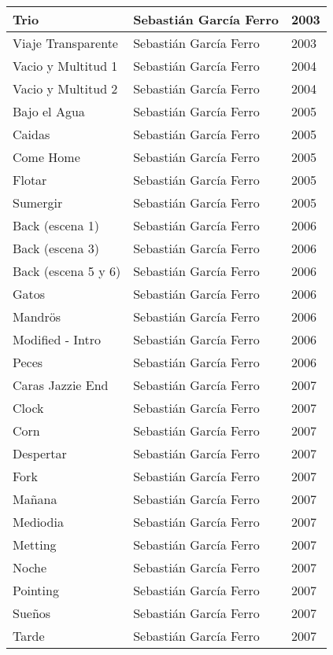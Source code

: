 \begin{center}
\begin{longtable}{ p{}  p{}  p{} }
Trio & Sebastián García Ferro & 2003 \\ \midrule 
Viaje Transparente & Sebastián García Ferro & 2003 \\ \midrule 
Vacio y Multitud 1 & Sebastián García Ferro & 2004 \\ \midrule 
Vacio y Multitud 2 & Sebastián García Ferro & 2004 \\ \midrule 
Bajo el Agua & Sebastián García Ferro & 2005 \\ \midrule 
Caidas & Sebastián García Ferro & 2005 \\ \midrule 
Come Home & Sebastián García Ferro & 2005 \\ \midrule 
Flotar & Sebastián García Ferro & 2005 \\ \midrule 
Sumergir & Sebastián García Ferro & 2005 \\ \midrule 
Back (escena 1) & Sebastián García Ferro & 2006 \\ \midrule 
Back (escena 3) & Sebastián García Ferro & 2006 \\ \midrule 
Back (escena 5 y 6) & Sebastián García Ferro & 2006 \\ \midrule 
Gatos & Sebastián García Ferro & 2006 \\ \midrule 
Mandrös & Sebastián García Ferro & 2006 \\ \midrule 
Modified - Intro & Sebastián García Ferro & 2006 \\ \midrule 
Peces & Sebastián García Ferro & 2006 \\ \midrule 
Caras Jazzie End & Sebastián García Ferro & 2007 \\ \midrule 
Clock & Sebastián García Ferro & 2007 \\ \midrule 
Corn & Sebastián García Ferro & 2007 \\ \midrule 
Despertar & Sebastián García Ferro & 2007 \\ \midrule 
Fork & Sebastián García Ferro & 2007 \\ \midrule 
Mañana & Sebastián García Ferro & 2007 \\ \midrule 
Mediodia & Sebastián García Ferro & 2007 \\ \midrule 
Metting & Sebastián García Ferro & 2007 \\ \midrule 
Noche & Sebastián García Ferro & 2007 \\ \midrule 
Pointing & Sebastián García Ferro & 2007 \\ \midrule 
Sueños & Sebastián García Ferro & 2007 \\ \midrule 
Tarde & Sebastián García Ferro & 2007 \\ \midrule 

\end{longtable}
\end{center}
